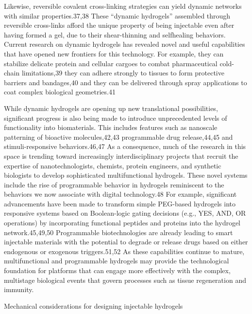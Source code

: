 \documentclass[../../main-notes.tex]{subfiles}
\begin{document}
Likewise, reversible covalent cross-linking strategies can yield dynamic networks with similar properties.37,38 
These “dynamic hydrogels” assembled through reversible cross-links afford the unique property of being injectable even after having formed a gel, due to their shear-thinning and selfhealing behaviors. 
Current research on dynamic hydrogels has revealed novel and useful capabilities that have opened new frontiers for this technology. 
For example, they can stabilize delicate protein and cellular cargoes to combat pharmaceutical  cold-chain limitations,39 they can adhere strongly to tissues to  form protective barriers and bandages,40 and they can be delivered through spray applications to coat complex biological  geometries.41


While dynamic hydrogels are opening up new translational possibilities, significant progress is also being made to introduce unprecedented levels of functionality into biomaterials. 
This includes features such as nanoscale patterning of  bioactive molecules,42,43 programmable drug release,44,45 and  stimuli-responsive behaviors.46,47 
As a consequence, much of the research in this space is trending toward increasingly interdisciplinary projects that recruit the expertise of nanotechnologists, chemists, protein engineers, and synthetic biologists to develop sophisticated multifunctional hydrogels. 
These novel systems include the rise of programmable behavior in hydrogels reminiscent to the behaviors we now  associate with digital technology.48 
For example, significant advancements have been made to transform simple PEG-based hydrogels into responsive systems based on Boolean-logic gating decisions (e.g., YES, AND, OR operations) by incorporating functional peptides and proteins into the  hydrogel network.45,49,50 
Programmable biotechnologies are already leading to smart injectable materials with the potential to degrade or release drugs based on either endogenous or  exogenous triggers.51,52 
As these capabilities continue to mature, multifunctional and programmable hydrogels may provide the technological foundation for platforms that can engage more effectively with the complex, multistage biological events that govern processes such as tissue regeneration and immunity.


Mechanical considerations for designing injectable hydrogels
\end{document}
